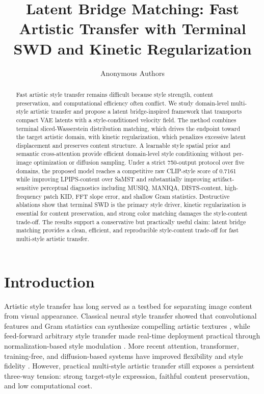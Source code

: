 ﻿\documentclass{article}
\title{Latent Bridge Matching: Fast Artistic Transfer with Terminal SWD and Kinetic Regularization}
\author{Anonymous Authors}
\date{}
\begin{document}
\maketitle

\begin{abstract}
Fast artistic style transfer remains difficult because style strength, content preservation, and computational efficiency often conflict. We study domain-level multi-style artistic transfer and propose a latent bridge-inspired framework that transports compact VAE latents with a style-conditioned velocity field. The method combines terminal sliced-Wasserstein distribution matching, which drives the endpoint toward the target artistic domain, with kinetic regularization, which penalizes excessive latent displacement and preserves content structure. A learnable style spatial prior and semantic cross-attention provide efficient domain-level style conditioning without per-image optimization or diffusion sampling. Under a strict 750-output protocol over five domains, the proposed model reaches a competitive raw CLIP-style score of 0.7161 while improving LPIPS-content over SaMST and substantially improving artifact-sensitive perceptual diagnostics including MUSIQ, MANIQA, DISTS-content, high-frequency patch KID, FFT slope error, and shallow Gram statistics. Destructive ablations show that terminal SWD is the primary style driver, kinetic regularization is essential for content preservation, and strong color matching damages the style-content trade-off. The results support a conservative but practically useful claim: latent bridge matching provides a clean, efficient, and reproducible style-content trade-off for fast multi-style artistic transfer.
\end{abstract}

\section{Introduction}
Artistic style transfer has long served as a testbed for separating image content from visual appearance. Classical neural style transfer showed that convolutional features and Gram statistics can synthesize compelling artistic textures \cite{gatys2016image}, while feed-forward arbitrary style transfer made real-time deployment practical through normalization-based style modulation \cite{huang2017adain}. More recent attention, transformer, training-free, and diffusion-based systems have improved flexibility and style fidelity \cite{park2019sanet,deng2022stytr2,hong2023aespa,huang2024aesfa,gim2024cast,chung2024styleid}. However, practical multi-style artistic transfer still exposes a persistent three-way tension: strong target-style expression, faithful content preservation, and low computational cost.
\end{document}
